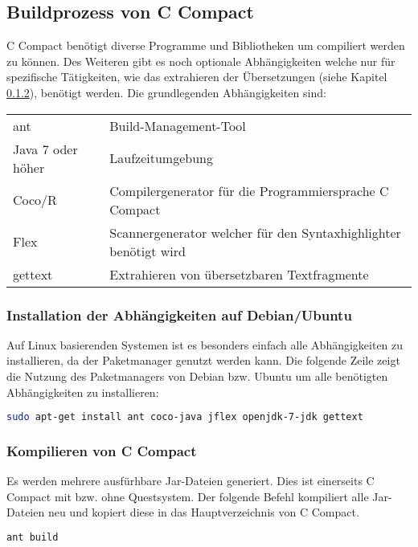 \subsection{Buildprozess von C Compact}

C Compact ben\"otigt diverse Programme und Bibliotheken um compiliert werden zu k\"onnen. Des Weiteren gibt es noch optionale Abh\"angigkeiten welche nur f\"ur spezifische T\"atigkeiten, wie das extrahieren der \"Ubersetzungen (siehe Kapitel \ref{}), ben\"otigt werden. Die grundlegenden Abh\"angigkeiten sind:

\begin{tabular}{l | l}
 ant & Build-Management-Tool\\
 Java 7 oder h\"oher & Laufzeitumgebung \\
 Coco/R & Compilergenerator f\"ur die Programmiersprache C Compact\\
 Flex & Scannergenerator welcher f\"ur den Syntaxhighlighter ben\"otigt wird\\
 gettext & Extrahieren von \"ubersetzbaren Textfragmente\\
\end{tabular}

\subsubsection{Installation der Abh\"angigkeiten auf Debian/Ubuntu}

Auf Linux basierenden Systemen ist es besonders einfach alle Abh\"angigkeiten zu installieren, da der Paketmanager genutzt werden kann. Die folgende Zeile zeigt die Nutzung des Paketmanagers von Debian bzw. Ubuntu um alle ben\"otigten Abh\"angigkeiten zu installieren:

\begin{lstlisting}[language=bash]
sudo apt-get install ant coco-java jflex openjdk-7-jdk gettext
\end{lstlisting}

\subsubsection{Kompilieren von C Compact}

Es werden mehrere ausf\"urhbare Jar-Dateien generiert. Dies ist einerseits C Compact mit bzw. ohne Questsystem. Der folgende Befehl kompiliert alle Jar-Dateien neu und kopiert diese in das Hauptverzeichnis von C Compact. 

\begin{lstlisting}[language=bash]
ant build
\end{lstlisting}

